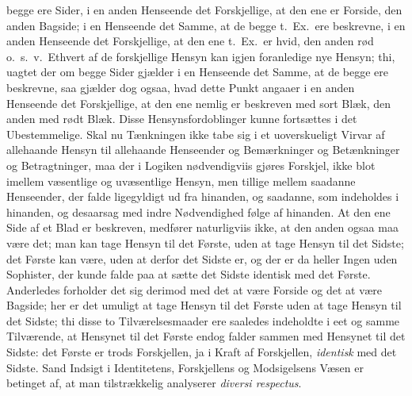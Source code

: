 \documentclass[12pt,a4paper]{book}
\begin{document}
begge ere Sider, i en anden Henseende det Forskjellige, at den ene er
Forside, den anden Bagside; i en Henseende det Samme, at de begge
t.\ Ex.\ ere beskrevne, i en anden Henseende det Forskjellige, at den
ene t.\ Ex.\ er hvid, den anden rød o.\ s.\ v.\ Ethvert af de
forskjellige Hensyn kan igjen foranledige nye Hensyn; thi, uagtet der om
begge Sider gjælder i en Henseende det Samme, at de begge ere beskrevne,
saa gjælder dog ogsaa, hvad dette Punkt angaaer i en anden Henseende det
Forskjellige, at den ene nemlig er beskreven med sort Blæk, den anden
med rødt Blæk. Disse Hensynsfordoblinger kunne fortsættes i det
Ubestemmelige. Skal nu Tænkningen ikke tabe sig i et uoverskueligt
Virvar af allehaande
Hensyn til allehaande Henseender og Bemærkninger og Betænkninger og
Betragtninger, maa der i Logiken nødvendigviis gjøres Forskjel, ikke
blot imellem væsentlige og uvæsentlige Hensyn, men
tillige mellem saadanne Henseender, der falde ligegyldigt ud fra
hinanden, og saadanne, som indeholdes i hinanden, og desaarsag med indre
Nødvendighed følge af hinanden. At den ene Side af et Blad er
beskreven, medfører naturligviis ikke, at den anden ogsaa maa være det;
man kan tage Hensyn til det Første, uden at tage Hensyn til det Sidste;
det Første kan være, uden at derfor det Sidste er, og der er da heller
Ingen uden Sophister, der kunde falde paa at sætte det Sidste identisk
med det Første. Anderledes forholder det sig derimod med det at være
Forside og det at være Bagside; her er det umuligt at tage Hensyn til
det Første uden at tage Hensyn til det Sidste; thi disse to
Tilværelsesmaader ere saaledes indeholdte i eet og samme Tilværende, at
Hensynet til det Første endog falder sammen med Hensynet til det Sidste:
det Første er trods Forskjellen, ja i Kraft af Forskjellen,
\emph{identisk} med det Sidste. Sand Indsigt i Identitetens,
Forskjellens og Modsigelsens Væsen er betinget af, at man tilstrækkelig
analyserer \textit{diversi respectus}.
\end{document}
